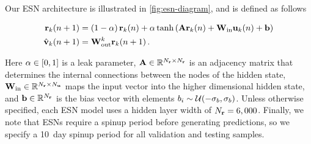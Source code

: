 \documentclass[draft]{agujournal2019}
\begin{document}
Our ESN architecture is illustrated in \cref{fig:esn-diagram}, and is defined as
follows
\begin{linenomath*}\begin{equation}
    \begin{aligned}
        \mathbf{r}_{k}(n+1)
        &=
        \left(1-\alpha\right)\mathbf{r}_{k}(n)
        +
        \alpha \tanh\left(
            \mathbf{A} \mathbf{r}_{k}(n) + \mathbf{W}_\text{in} \mathbf{u}_{k}(n) + \mathbf{b}
            \right)
             \\
        \hat{\mathbf{v}}_{k}(n+1)
        &= \mathbf{W}_\text{out}^{k} \mathbf{r}_{k}(n+1) \, .
    \end{aligned}
    \label{eq:rc}
\end{equation}\end{linenomath*}
Here
$\alpha\in[0,1]$ is a leak parameter,
$\mathbf{A} \in \mathbb{R}^{N_{\mathbf{r}}\times N_{\mathbf{r}}}$ is an adjacency matrix that
determines the internal connections between the nodes of the hidden state,
$\mathbf{W}_\text{in} \in \mathbb{R}^{N_{\mathbf{r}}\times N_{\mathbf{u}}}$ maps the input vector
into the higher dimensional hidden state,
and $\mathbf{b}\in\mathbb{R}^{N_{\mathbf{r}}}$
is the bias vector with elements
$b_i \sim \mathcal{U}(-\sigma_{b},\sigma_{b})$.
Unless otherwise specified, each ESN model uses a hidden layer width of
$N_{\mathbf{r}}=6,000$.
Finally, we note that ESNs require a spinup period before generating
predictions, so we specify a 10~day spinup period for all validation and testing
samples.
\end{document}
